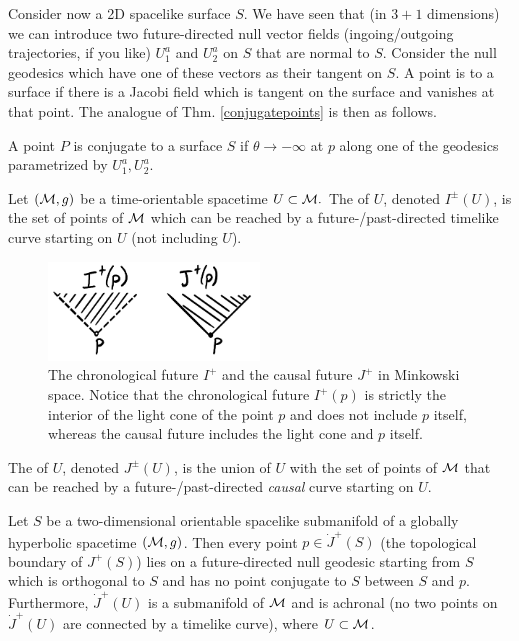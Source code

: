 Consider now a 2D spacelike surface $S$. We have seen that (in $3+1$ dimensions) we can introduce two future-directed null vector fields (ingoing/outgoing trajectories, if you like) $U^a_1$ and $U^a_2$ on $S$ that are normal to $S$. Consider the null geodesics which have one of these vectors as their tangent on $S$. A point is  to a surface if there is a Jacobi field which is tangent on the surface and vanishes at that point. The analogue of Thm. \ref{conjugatepoints} is then as follows.

\begin{thm}
    A point $P$ is conjugate to a surface $S$ if $\theta \to -\infty$ at $p$ along one of the geodesics parametrized by $U^a_1,U^a_2$.
\end{thm}

\begin{defn}
    Let $(\mathcal{M},g)$ be a time-orientable spacetime $U\subset{ \mathcal{M}}.$ The  of $U$, denoted $I^\pm(U)$, is the set of points of $\mathcal{M}$ which can be reached by a future-/past-directed timelike curve starting on $U$ (not including $U$).
\end{defn}
\begin{figure}
    \centering
    \includegraphics[width=0.5\textwidth]{2019/02/20190221_chronofuture.png}
    \caption{The chronological future $I^+$ and the causal future $J^+$ in Minkowski space. Notice that the chronological future $I^+(p)$ is strictly the interior of the light cone of the point $p$ and does not include $p$ itself, whereas the causal future includes the light cone and $p$ itself.}
    \label{fig:chronofuture}
\end{figure}
\begin{defn}
    The  of $U$, denoted $J^\pm(U)$, is the union of $U$ with the set of points of $\mathcal{M}$ that can be reached by a future-/past-directed \emph{causal} curve starting on $U$.
\end{defn}

\begin{thm}\label{surfaceconjugatepoints}
    Let $S$ be a two-dimensional orientable spacelike submanifold of a globally hyperbolic spacetime $(\mathcal{M},g)$. Then every point $p\in \dot J^+(S)$ (the topological boundary of $J^+(S)$) lies on a future-directed null geodesic starting from $S$ which is orthogonal to $S$ and has no point conjugate to $S$ between $S$ and $p$. Furthermore, $\dot J^+(U)$ is a submanifold of $\mathcal{M}$ and is achronal (no two points on $\dot J^+(U)$ are connected by a timelike curve), where $U\subset \mathcal{M}$.
\end{thm}
